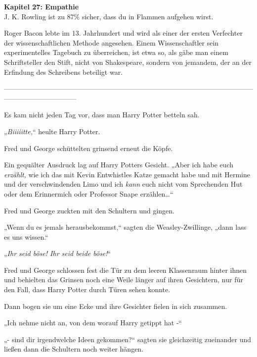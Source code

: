 

\hypertarget{empathie}{%

\textbf{Kapitel 27: Empathie}\\

J. K. Rowling ist zu 87\% sicher, dass du in Flammen aufgehen wirst.

Roger Bacon lebte im 13. Jahrhundert und wird als einer der ersten Verfechter der wissenschaftlichen Methode angesehen. Einem Wissenschaftler sein experimentelles Tagebuch zu überreichen, ist etwa so, als gäbe man einem Schriftsteller den Stift, nicht von Shakespeare, sondern von jemandem, der an der Erfindung des Schreibens beteiligt war.

--------------------------------------------------------------------------------------------------------------------------------------------

Es kam nicht jeden Tag vor, dass man Harry Potter betteln sah.

„\emph{Biiiiitte,}“ heulte Harry Potter.

Fred und George schüttelten grinsend erneut die Köpfe.

Ein gequälter Ausdruck lag auf Harry Potters Gesicht. „Aber ich habe euch \emph{erzählt,} wie ich das mit Kevin Entwhistles Katze gemacht habe und mit Hermine und der verschwindenden Limo und ich \emph{kann} euch nicht vom Sprechenden Hut oder dem Erinnermich oder Professor Snape erzählen…“

Fred und George zuckten mit den Schultern und gingen.

„Wenn du es jemals herausbekommst,“ sagten die Weasley-Zwillinge, „dann lass es uns wissen.“

„\emph{Ihr seid böse! Ihr seid beide böse!}“

Fred und George schlossen fest die Tür zu dem leeren Klassenraum hinter ihnen und behielten das Grinsen noch eine Weile länger auf ihren Gesichtern, nur für den Fall, dass Harry Potter durch Türen sehen konnte.

Dann bogen sie um eine Ecke und ihre Gesichter fielen in sich zusammen.

„Ich nehme nicht an, von dem worauf Harry getippt hat -“

„- sind dir irgendwelche Ideen gekommen?“ sagten sie gleichzeitig zueinander und ließen dann die Schultern noch weiter hängen.

}
